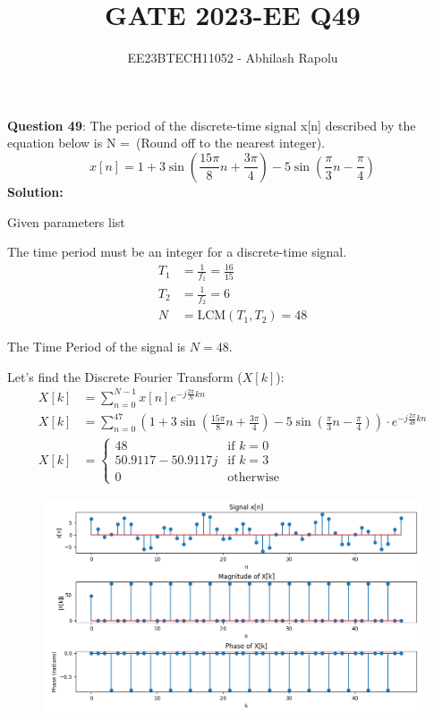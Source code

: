 \documentclass[journal,12pt,twocolumn]{IEEEtran}
\title{GATE 2023-EE Q49}
\author{EE23BTECH11052 - Abhilash Rapolu}
\begin{document}
\maketitle
\newpage
\textbf{Question 49}: The period of the discrete-time signal x[n] described by the equation below is N =\ (Round off to the nearest integer).
$$x[n] = 1 + 3\sin\left(\frac{15\pi}{8}n + \frac{3\pi}{4}\right) - 5\sin\left(\frac{\pi}{3}n - \frac{\pi}{4}\right)$$
\textbf{Solution:}
\fi
\begin{table}[htbp]
\centering
 
\caption{Given parameters list}
\end{table}

The time period must be an integer for a discrete-time signal.
\begin{align}
T_1 &= \frac{1}{f_1} = \frac{16}{15} \\
T_2 &= \frac{1}{f_2} = 6 \\
N &= \text{LCM}(T_1, T_2) = 48
\end{align}

The Time Period of the signal is \(N = 48\).

Let's find the Discrete Fourier Transform (\(X[k]\)):
\begin{align}
X[k] &= \sum_{n=0}^{N-1} x[n]e^{-j\frac{2\pi}{N}kn} \\
X[k] &= \sum_{n=0}^{47} \left(1 + 3\sin\left(\frac{15\pi}{8}n + \frac{3\pi}{4}\right) 
- 5\sin\left(\frac{\pi}{3}n - \frac{\pi}{4}\right)\right) \cdot e^{-j\frac{2\pi}{48}kn} \\
X[k] &= \begin{cases}
    48 & \text{if } k = 0 \\
    50.9117 - 50.9117j & \text{if } k = 3 \\
    0 & \text{otherwise}
\end{cases}
\end{align}

\begin{figure}[!ht] 
\centering
\includegraphics[width=\columnwidth]{2023/EE/49/figs/EE.49.png}
\end{figure}

\end{document}
